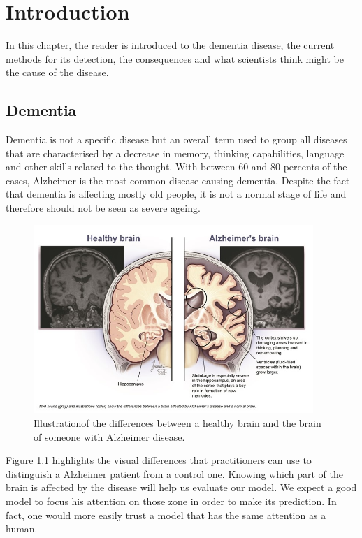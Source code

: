 \chapter{Introduction}
In this chapter, the reader is introduced to the dementia disease, the current methods for its detection, the consequences and what scientists think might be the cause of the disease. 

\section{Dementia}

Dementia is not a specific disease but an overall term used to group all diseases that are characterised by a decrease in memory, thinking capabilities, language and other skills related to the thought. With between 60 and 80 percents of the cases, Alzheimer is the most common disease-causing dementia. Despite the fact that dementia is affecting mostly old people, it is not a normal stage of life and therefore should not be seen as severe ageing. 

\begin{figure}
 \centering
 \includegraphics[width=400]{figures/Alzheimer_brain.jpg}
 \caption[Test]{Illustration\footnotemark of the differences between a healthy brain and the brain of someone with Alzheimer disease.}
 \label{fig:alzheimerbrain}
\end{figure}

Figure \ref{fig:alzheimerbrain} highlights the visual differences that practitioners can use to distinguish a Alzheimer patient from a control one. Knowing which part of the brain is affected by the disease will help us evaluate our model. We expect a good model to focus his attention on those zone in order to make its prediction. In fact, one would more easily trust a model that has the same attention as a human.

